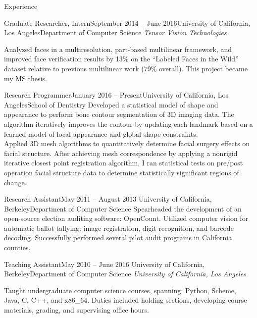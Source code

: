 \documentclass{resume}
\begin{document}
\begin{component}{Experience}
	\begin{position}{Graduate Researcher, Intern}{September 2014 -- June 2016}{University of California, Los Angeles}{Department of Computer Science}
	\emph{Tensor Vision Technologies}

    {Analyzed faces in a multiresolution, part-based multilinear framework, and improved face verification results by 13\% on the ``Labeled Faces in the Wild'' dataset relative to previous multilinear work (79\% overall).
This project became my MS thesis.
}
	\end{position}

\vspace{-0.25em}

    \begin{position}{Research Programmer}{January 2016 -- Present}{University of California, Los Angeles}{School of Dentistry}
{
Developed a statistical model of shape and appearance to perform bone contour segmentation of 3D imaging data.
The algorithm iteratively improves the contour by updating each landmark based on a learned model of local appearance and global shape constraints.
\\
Applied 3D mesh algorithms to quantitatively determine facial surgery effects on facial structure.
After achieving mesh correspondence by applying a nonrigid iterative closest point registration algorithm, I ran statistical tests on pre/post operation facial structure data to determine statistically significant regions of change.
}
      \end{position}

\vspace{-0.25em}

	\begin{position}{Research Assistant}{May 2011 -- August 2013}
	 	{University of California, Berkeley}{Department of Computer Science}
	{Spearheaded the development of an open-source election auditing software: OpenCount.
     Utilized computer vision for automatic ballot tallying: image registration, digit recognition, and barcode decoding.
     Successfully performed
         several pilot audit programs in California counties.
}
	\end{position}

\vspace{-0.25em}

	\begin{position}{Teaching Assistant}{May 2010 -- June 2016}
		{University of California, Berkeley}{Department of Computer Science}
    \emph{University of California, Los Angeles}

	{Taught undergraduate computer science courses, spanning: Python, Scheme, Java, C, C++, and x86\_64.
	 Duties included holding sections, developing course materials, grading, and supervising office hours.}
	\end{position}
\end{component}
\end{document}
